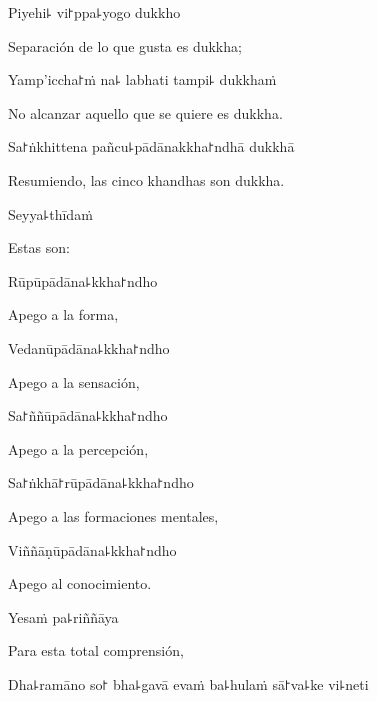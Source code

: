 Piyehi꜕ vi꜓ppa꜕yogo dukkho

\begin{english}
  Separación de lo que gusta es dukkha;
\end{english}

Yamp'iccha꜓ṁ na꜕ labhati tampi꜕ dukkhaṁ

\begin{english}
  No alcanzar aquello que se quiere es dukkha.
\end{english}

Sa꜓ṅkhittena pañcu꜕pādānakkha꜓ndhā dukkhā

\begin{english}
  Resumiendo, las cinco khandhas son dukkha.
\end{english}

Seyya꜕thīdaṁ

\begin{english}
  Estas son:
\end{english}

\clearpage

Rūpūpādāna꜕kkha꜓ndho

\begin{english}
  Apego a la forma,
\end{english}

Vedanūpādāna꜕kkha꜓ndho

\begin{english}
  Apego a la sensación,
\end{english}

Sa꜓ññūpādāna꜕kkha꜓ndho

\begin{english}
  Apego a la percepción,
\end{english}

Sa꜓ṅkhā꜓rūpādāna꜕kkha꜓ndho

\begin{english}
  Apego a las formaciones mentales,
\end{english}

Viññāṇūpādāna꜕kkha꜓ndho

\begin{english}
  Apego al conocimiento.
\end{english}

Yesaṁ pa꜕riññāya

\begin{english}
  Para esta total comprensión,
\end{english}

Dha꜕ramāno so꜓ bha꜕gavā evaṁ ba꜕hulaṁ sā꜓va꜕ke vi꜕neti

